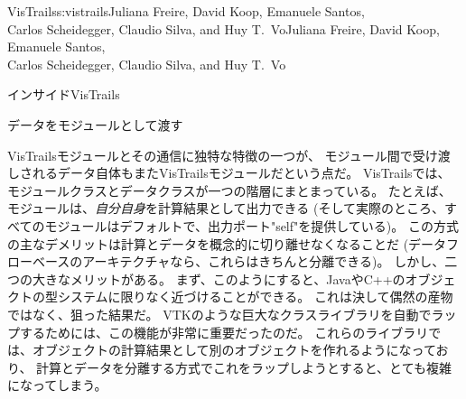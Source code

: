 \begin{aosachaptertoc}{VisTrails}{s:vistrails}{Juliana Freire, David Koop, Emanuele Santos, \\ Carlos Scheidegger, Claudio Silva, and Huy T.\ Vo}{Juliana Freire, David Koop, Emanuele Santos, \\ \hspace*{0.9cm} Carlos Scheidegger, Claudio Silva, and Huy T.\ Vo}
\begin{aosasect1}{インサイドVisTrails}
\begin{aosasect2}{データをモジュールとして渡す}

VisTrailsモジュールとその通信に独特な特徴の一つが、
モジュール間で受け渡しされるデータ自体もまたVisTrailsモジュールだという点だ。
VisTrailsでは、モジュールクラスとデータクラスが一つの階層にまとまっている。
たとえば、モジュールは、\emph{自分自身}を計算結果として出力できる
(そして実際のところ、すべてのモジュールはデフォルトで、出力ポート"self"を提供している)。
この方式の主なデメリットは計算とデータを概念的に切り離せなくなることだ
(データフローベースのアーキテクチャなら、これらはきちんと分離できる)。
しかし、二つの大きなメリットがある。
まず、このようにすると、JavaやC++のオブジェクトの型システムに限りなく近づけることができる。
これは決して偶然の産物ではなく、狙った結果だ。
VTKのような巨大なクラスライブラリを自動でラップするためには、この機能が非常に重要だったのだ。
これらのライブラリでは、オブジェクトの計算結果として別のオブジェクトを作れるようになっており、
計算とデータを分離する方式でこれをラップしようとすると、とても複雑になってしまう。


\end{aosasect2}
\end{aosasect1}
\end{aosachaptertoc}
